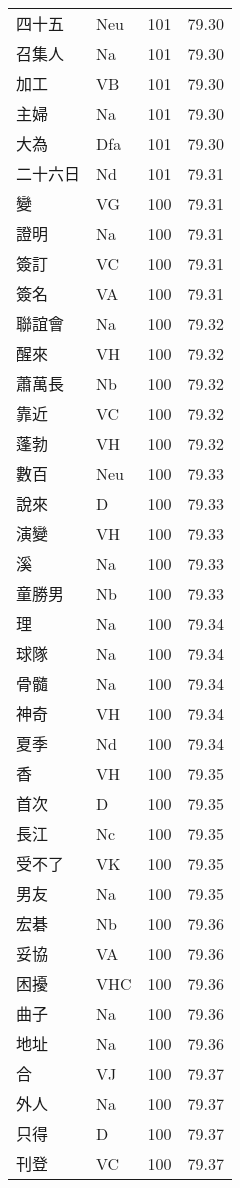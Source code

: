 \documentclass[twocolumn]{book}
\begin{document}
\begin{supertabular}{llrr}
四十五 & Neu & 101 &  79.30\\
召集人 & Na & 101 &  79.30\\
加工 & VB & 101 &  79.30\\
主婦 & Na & 101 &  79.30\\
大為 & Dfa & 101 &  79.30\\
二十六日 & Nd & 101 &  79.31\\
變 & VG & 100 &  79.31\\
證明 & Na & 100 &  79.31\\
簽訂 & VC & 100 &  79.31\\
簽名 & VA & 100 &  79.31\\
聯誼會 & Na & 100 &  79.32\\
醒來 & VH & 100 &  79.32\\
蕭萬長 & Nb & 100 &  79.32\\
靠近 & VC & 100 &  79.32\\
蓬勃 & VH & 100 &  79.32\\
數百 & Neu & 100 &  79.33\\
說來 & D & 100 &  79.33\\
演變 & VH & 100 &  79.33\\
溪 & Na & 100 &  79.33\\
童勝男 & Nb & 100 &  79.33\\
理 & Na & 100 &  79.34\\
球隊 & Na & 100 &  79.34\\
骨髓 & Na & 100 &  79.34\\
神奇 & VH & 100 &  79.34\\
夏季 & Nd & 100 &  79.34\\
香 & VH & 100 &  79.35\\
首次 & D & 100 &  79.35\\
長江 & Nc & 100 &  79.35\\
受不了 & VK & 100 &  79.35\\
男友 & Na & 100 &  79.35\\
宏碁 & Nb & 100 &  79.36\\
妥協 & VA & 100 &  79.36\\
困擾 & VHC & 100 &  79.36\\
曲子 & Na & 100 &  79.36\\
地址 & Na & 100 &  79.36\\
合 & VJ & 100 &  79.37\\
外人 & Na & 100 &  79.37\\
只得 & D & 100 &  79.37\\
刊登 & VC & 100 &  79.37\\

\end{supertabular}
\end{document}
